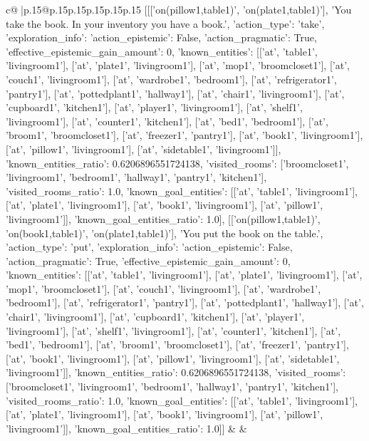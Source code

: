 \documentclass{article}
\begin{document}
{\begin{supertabular}{c@{$\;$}|p{.15\linewidth}@{}p{.15\linewidth}p{.15\linewidth}p{.15\linewidth}p{.15\linewidth}p{.15\linewidth}}
{{{	 [[['on(pillow1,table1)', 'on(plate1,table1)'], 'You take the book. In your inventory you have a book.', {'action_type': 'take', 'exploration_info': {'action_epistemic': False, 'action_pragmatic': True, 'effective_epistemic_gain_amount': 0, 'known_entities': [['at', 'table1', 'livingroom1'], ['at', 'plate1', 'livingroom1'], ['at', 'mop1', 'broomcloset1'], ['at', 'couch1', 'livingroom1'], ['at', 'wardrobe1', 'bedroom1'], ['at', 'refrigerator1', 'pantry1'], ['at', 'pottedplant1', 'hallway1'], ['at', 'chair1', 'livingroom1'], ['at', 'cupboard1', 'kitchen1'], ['at', 'player1', 'livingroom1'], ['at', 'shelf1', 'livingroom1'], ['at', 'counter1', 'kitchen1'], ['at', 'bed1', 'bedroom1'], ['at', 'broom1', 'broomcloset1'], ['at', 'freezer1', 'pantry1'], ['at', 'book1', 'livingroom1'], ['at', 'pillow1', 'livingroom1'], ['at', 'sidetable1', 'livingroom1']], 'known_entities_ratio': 0.6206896551724138, 'visited_rooms': ['broomcloset1', 'livingroom1', 'bedroom1', 'hallway1', 'pantry1', 'kitchen1'], 'visited_rooms_ratio': 1.0, 'known_goal_entities': [['at', 'table1', 'livingroom1'], ['at', 'plate1', 'livingroom1'], ['at', 'book1', 'livingroom1'], ['at', 'pillow1', 'livingroom1']], 'known_goal_entities_ratio': 1.0}}], [['on(pillow1,table1)', 'on(book1,table1)', 'on(plate1,table1)'], 'You put the book on the table.', {'action_type': 'put', 'exploration_info': {'action_epistemic': False, 'action_pragmatic': True, 'effective_epistemic_gain_amount': 0, 'known_entities': [['at', 'table1', 'livingroom1'], ['at', 'plate1', 'livingroom1'], ['at', 'mop1', 'broomcloset1'], ['at', 'couch1', 'livingroom1'], ['at', 'wardrobe1', 'bedroom1'], ['at', 'refrigerator1', 'pantry1'], ['at', 'pottedplant1', 'hallway1'], ['at', 'chair1', 'livingroom1'], ['at', 'cupboard1', 'kitchen1'], ['at', 'player1', 'livingroom1'], ['at', 'shelf1', 'livingroom1'], ['at', 'counter1', 'kitchen1'], ['at', 'bed1', 'bedroom1'], ['at', 'broom1', 'broomcloset1'], ['at', 'freezer1', 'pantry1'], ['at', 'book1', 'livingroom1'], ['at', 'pillow1', 'livingroom1'], ['at', 'sidetable1', 'livingroom1']], 'known_entities_ratio': 0.6206896551724138, 'visited_rooms': ['broomcloset1', 'livingroom1', 'bedroom1', 'hallway1', 'pantry1', 'kitchen1'], 'visited_rooms_ratio': 1.0, 'known_goal_entities': [['at', 'table1', 'livingroom1'], ['at', 'plate1', 'livingroom1'], ['at', 'book1', 'livingroom1'], ['at', 'pillow1', 'livingroom1']], 'known_goal_entities_ratio': 1.0}}]] 
	  } 
	   } 
	   } 
	 & & \\ 
 

    \theutterance {}  


\end{supertabular}}
\end{document}
